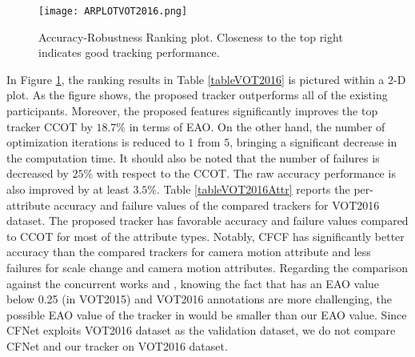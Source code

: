 \documentclass[journal]{IEEEtran}
\begin{document}
\begin{figure}[ht]
\centering
\texttt{[image: ARPLOTVOT2016.png]}
\caption{Accuracy-Robustness Ranking plot. Closeness to the top right indicates good tracking performance.}
\label{ARPLOTVOT2016}
\end{figure}
In Figure \ref{ARPLOTVOT2016}, the ranking results in Table \ref{tableVOT2016} is pictured within a $2$-D plot. As the figure shows, the proposed tracker outperforms all of the existing participants. Moreover, the proposed features significantly improves the top tracker CCOT by $18.7$\% in terms of EAO. On the other hand, the number of optimization iterations is reduced to $1$ from $5$, bringing a significant decrease in the computation time. It should also be noted that the number of failures is decreased by $25$\% with respect to the CCOT. The raw accuracy performance is also improved by at least $3.5$\%. Table \ref{tableVOT2016Attr} reports the per-attribute accuracy and failure values of the compared trackers for VOT2016 dataset. The proposed tracker has favorable accuracy and failure values compared to CCOT for most of the attribute types. Notably, CFCF has significantly better accuracy than the compared trackers for camera motion attribute and less failures for scale change and camera motion attributes. Regarding the comparison against the concurrent works \cite{CFNet} and \cite{DCFNet}, knowing the fact that \cite{DCFNet} has an EAO value below 0.25 (in VOT2015) and VOT2016 annotations are more challenging, the possible EAO value of the tracker in \cite{DCFNet} would be smaller than our EAO value. Since CFNet \cite{CFNet} exploits VOT2016 dataset as the validation dataset, we do not compare CFNet \cite{CFNet} and our tracker on VOT2016 dataset.
\end{document}
